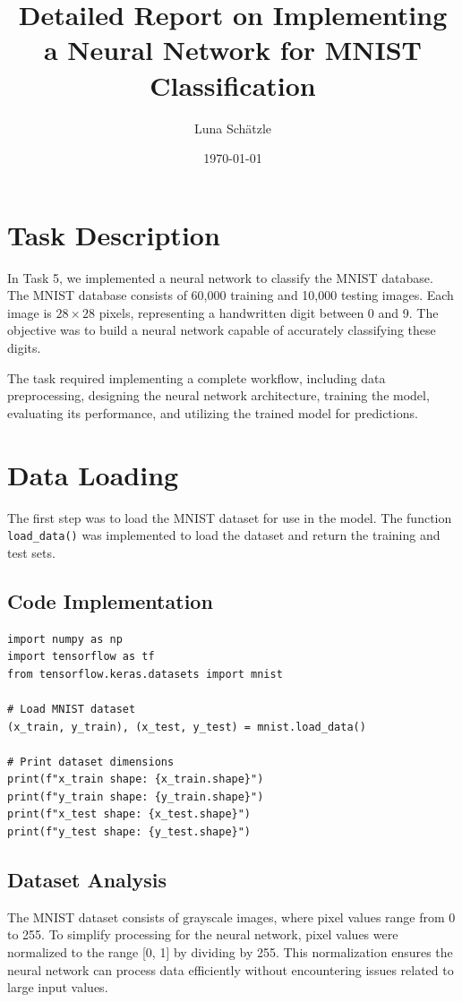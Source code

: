 \documentclass[12pt,a4paper]{article}
\title{\textbf{Detailed Report on Implementing a Neural Network for MNIST Classification}}
\author{Luna Schätzle}
\date{\today}
\begin{document}
\maketitle

\section*{Task Description}
In Task 5, we implemented a neural network to classify the MNIST database. The MNIST database consists of 60,000 training and 10,000 testing images. Each image is $28 \times 28$ pixels, representing a handwritten digit between 0 and 9. The objective was to build a neural network capable of accurately classifying these digits.

The task required implementing a complete workflow, including data preprocessing, designing the neural network architecture, training the model, evaluating its performance, and utilizing the trained model for predictions.

\section*{Data Loading}
The first step was to load the MNIST dataset for use in the model. The function \texttt{load\_data()} was implemented to load the dataset and return the training and test sets.

\subsection*{Code Implementation}
\begin{lstlisting}
import numpy as np
import tensorflow as tf
from tensorflow.keras.datasets import mnist

# Load MNIST dataset
(x_train, y_train), (x_test, y_test) = mnist.load_data()

# Print dataset dimensions
print(f"x_train shape: {x_train.shape}")
print(f"y_train shape: {y_train.shape}")
print(f"x_test shape: {x_test.shape}")
print(f"y_test shape: {y_test.shape}")
\end{lstlisting}

\subsection*{Dataset Analysis}
The MNIST dataset consists of grayscale images, where pixel values range from 0 to 255. To simplify processing for the neural network, pixel values were normalized to the range [0, 1] by dividing by 255. This normalization ensures the neural network can process data efficiently without encountering issues related to large input values.
\end{document}
